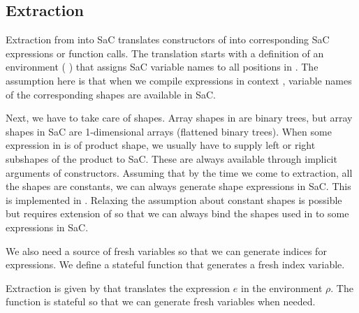 \subsection{Extraction}

Extraction from  into SaC translates constructors of  into
corresponding SaC expressions or function calls.  The translation starts with
a definition of an environment ( ) that assigns SaC variable names
to all positions in .  The assumption here is that when we compile
expressions in context , variable names of the corresponding shapes are
available in SaC.

Next, we have to take care of shapes.  Array shapes in  are binary trees,
but array shapes in SaC are 1-dimensional arrays (flattened binary trees).
When some expression in  is of product shape, we usually have to
supply left or right subshapes of the product to SaC. These are always available
through implicit arguments of  constructors. Assuming that by the
time we come to extraction, all the  shapes are constants, we can
always generate shape expressions in SaC.  This is implemented in .
Relaxing the assumption about constant shapes is possible but requires
extension of  so that we can always bind the shapes used in 
to some expressions in SaC.

We also need a source of fresh variables so that we can generate indices
for  expressions.  We define a stateful function  that
generates a fresh index variable.  

Extraction is given by  that translates the expression $e$ in
the environment $\rho$.  The function is stateful so that we can generate
fresh variables when needed.

